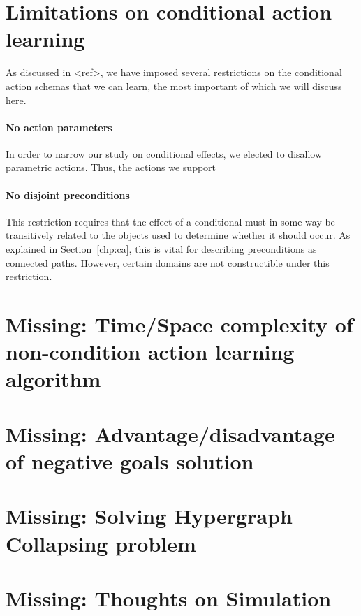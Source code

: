 \documentclass[Master.tex]{subfiles}
\begin{document}
\section{Limitations on conditional action learning}
As discussed in <ref>, we have imposed several restrictions on the conditional action schemas that we can learn, the most important of which we will discuss here.

\paragraph*{No action parameters}
In order to narrow our study on conditional effects, we elected to disallow parametric actions. Thus, the actions we support 


\paragraph{No disjoint preconditions}
This restriction requires that the effect of a conditional must in some way be transitively related to the objects used to determine whether it should occur. As explained in Section~\ref{chp:ca}, this is vital for describing preconditions as connected paths. However, certain domains are not constructible under this restriction. 


\section{Missing: Time/Space complexity of non-condition action learning algorithm}

\section{Missing: Advantage/disadvantage of negative goals solution}

\section{Missing: Solving Hypergraph Collapsing problem}

\section{Missing: Thoughts on Simulation}

%    
%
%    
%
%    
\end{document}
